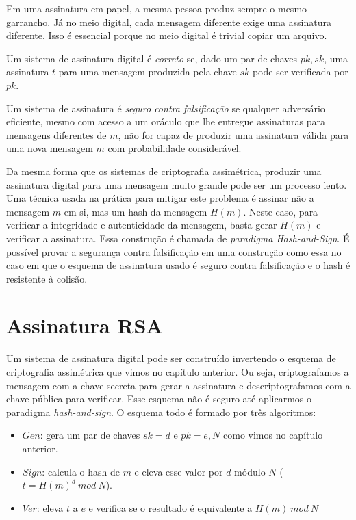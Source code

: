 Em uma assinatura em papel, a mesma pessoa produz sempre o mesmo garrancho.
Já no meio digital, cada mensagem diferente exige uma assinatura diferente.
Isso é essencial porque no meio digital é trivial copiar um arquivo.

Um sistema de assinatura digital é {\em correto} se, dado um par de chaves $pk, sk$, uma assinatura $t$ para uma mensagem produzida pela chave $sk$ pode ser verificada por $pk$.

Um sistema de assinatura é {\em seguro contra falsificação} se qualquer adversário eficiente, mesmo com acesso a um oráculo que lhe entregue assinaturas para mensagens diferentes de $m$, não for capaz de produzir uma assinatura válida para uma nova mensagem $m$ com probabilidade considerável.

Da mesma forma que os sistemas de criptografia assimétrica, produzir uma assinatura digital para uma mensagem muito grande pode ser um processo lento.
Uma técnica usada na prática para mitigar este problema é assinar não a mensagem $m$ em si, mas um hash da mensagem $H(m)$.
Neste caso, para verificar a integridade e autenticidade da mensagem, basta gerar $H(m)$ e verificar a assinatura.
Essa construção é chamada de {\em paradigma Hash-and-Sign}.
É possível provar a segurança contra falsificação em uma construção como essa no caso em que o esquema de assinatura usado é seguro contra falsificação e o hash é resistente à colisão.

\section{Assinatura RSA}
\label{sec:assinatura-rsa}
Um sistema de assinatura digital pode ser construído invertendo o esquema de criptografia assimétrica que vimos no capítulo anterior.
Ou seja, criptografamos a mensagem com a chave secreta para gerar a assinatura e descriptografamos com a chave pública para verificar.
Esse esquema não é seguro até aplicarmos o paradigma {\em hash-and-sign}.
O esquema todo é formado por três algoritmos:

\begin{itemize}
\item[] $Gen$: gera um par de chaves $sk = d$ e $pk = e, N$ como vimos no capítulo anterior.
\item[] $Sign$: calcula o hash de $m$ e eleva esse valor por $d$ módulo $N$ ($t = H(m)^d\ mod\ N$).
\item[] $Ver$: eleva $t$ a $e$ e verifica se o resultado é equivalente a $H(m)\ mod\ N$ 
\end{itemize}

